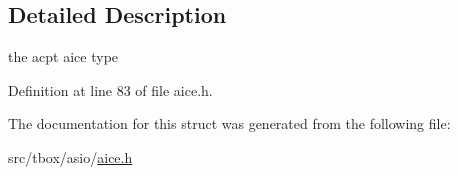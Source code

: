 \subsection{Detailed Description}
the acpt aice type 

Definition at line 83 of file aice.\-h.



The documentation for this struct was generated from the following file\-:\begin{DoxyCompactItemize}
\item 
src/tbox/asio/\hyperlink{aice_8h}{aice.\-h}\end{DoxyCompactItemize}

